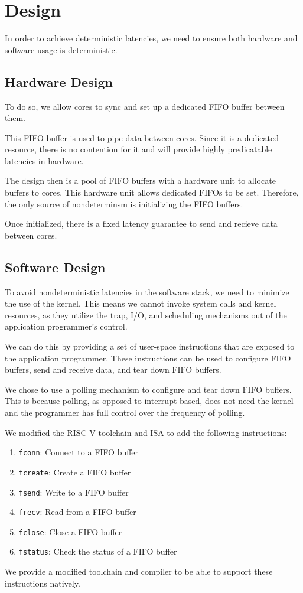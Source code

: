 \section{Design}

In order to achieve deterministic latencies, we need to ensure both hardware and software usage is deterministic. 

\subsection{Hardware Design}
To do so, we allow cores to sync and set up a dedicated FIFO buffer between them.

This FIFO buffer is used to pipe data between cores. Since it is a dedicated resource, there is no contention for it and will provide highly predicatable latencies in hardware.

The design then is a pool of FIFO buffers with a hardware unit to allocate buffers to cores. This hardware unit allows dedicated FIFOs to be set. Therefore, the only source of nondeterminsm is initializing the FIFO buffers.

Once initialized, there is a fixed latency guarantee to send and recieve data between cores. 

\subsection{Software Design}
To avoid nondeterministic latencies in the software stack, we need to minimize the use of the kernel. This means we cannot invoke system calls and kernel resources, as they utilize the trap, I/O, and scheduling mechanisms out of the application programmer's control.

We can do this by providing a set of user-space instructions that are exposed to the application programmer. These instructions can be used to configure FIFO buffers, send and receive data, and tear down FIFO buffers. 

We chose to use a polling mechanism to configure and tear down FIFO buffers. This is because polling, as opposed to interrupt-based, does not need the kernel and the programmer has full control over the frequency of polling. 

We modified the RISC-V toolchain and ISA to add the following instructions:
\begin{enumerate}
  \item \texttt{fconn}: Connect to a FIFO buffer
  \item \texttt{fcreate}: Create a FIFO buffer
  \item \texttt{fsend}: Write to a FIFO buffer
  \item \texttt{frecv}: Read from a FIFO buffer
  \item \texttt{fclose}: Close a FIFO buffer
  \item \texttt{fstatus}: Check the status of a FIFO buffer
\end{enumerate}

We provide a modified toolchain and compiler to be able to support these instructions natively.
